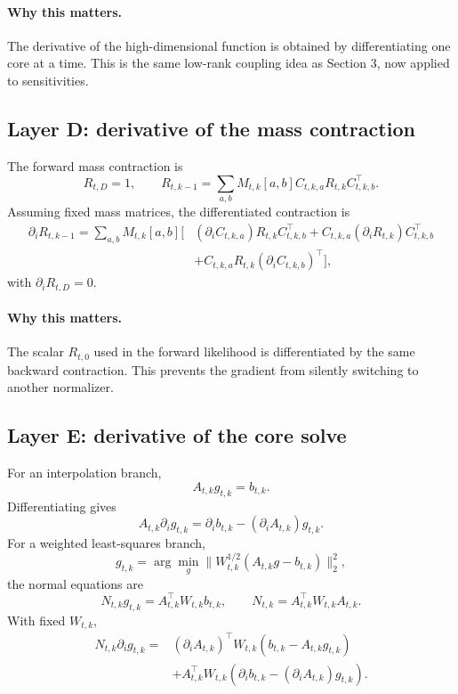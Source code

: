 \documentclass[11pt]{article}
\renewcommand{\[}{\begin{equation}}
\renewcommand{\]}{\end{equation}}
\theoremstyle{definition}
\theoremstyle{remark}
\begin{document}
\paragraph{Why this matters.}
The derivative of the high-dimensional function is obtained by differentiating
one core at a time.  This is the same low-rank coupling idea as Section 3, now
applied to sensitivities.

\subsection*{Layer D: derivative of the mass contraction}

The forward mass contraction is
\[
  R_{t,D}=1,\qquad
  R_{t,k-1}
  =
  \sum_{a,b}
  M_{t,k}[a,b]C_{t,k,a}R_{t,k}C_{t,k,b}^{\top}.
  \label{eq:p14-layerD-R}
\]
Assuming fixed mass matrices, the differentiated contraction is
\[
\begin{aligned}
  \partial_iR_{t,k-1}
  =
  \sum_{a,b}M_{t,k}[a,b]\Big[
  &(\partial_iC_{t,k,a})R_{t,k}C_{t,k,b}^{\top}
  +C_{t,k,a}(\partial_iR_{t,k})C_{t,k,b}^{\top}\\
  &+C_{t,k,a}R_{t,k}(\partial_iC_{t,k,b})^{\top}
  \Big],
\end{aligned}
  \label{eq:p14-layerD-Rdot}
\]
with \(\partial_iR_{t,D}=0\).

\paragraph{Why this matters.}
The scalar \(R_{t,0}\) used in the forward likelihood is differentiated by the
same backward contraction.  This prevents the gradient from silently switching
to another normalizer.

\subsection*{Layer E: derivative of the core solve}

For an interpolation branch,
\[
  A_{t,k}g_{t,k}=b_{t,k}.
  \label{eq:p14-layerE-interp}
\]
Differentiating gives
\[
  A_{t,k}\partial_i g_{t,k}
  =
  \partial_i b_{t,k}
  -
  (\partial_iA_{t,k})g_{t,k}.
  \label{eq:p14-layerE-interpdot}
\]
For a weighted least-squares branch,
\[
  g_{t,k}
  =
  \arg\min_g
  \|W_{t,k}^{1/2}(A_{t,k}g-b_{t,k})\|_2^2,
  \label{eq:p14-layerE-ls}
\]
the normal equations are
\[
  N_{t,k}g_{t,k}=A_{t,k}^{\top}W_{t,k}b_{t,k},
  \qquad
  N_{t,k}=A_{t,k}^{\top}W_{t,k}A_{t,k}.
  \label{eq:p14-layerE-normal}
\]
With fixed \(W_{t,k}\),
\[
\begin{aligned}
  N_{t,k}\partial_i g_{t,k}
  =
  &(\partial_i A_{t,k})^\top W_{t,k}
  (b_{t,k}-A_{t,k}g_{t,k})\\
  &+
  A_{t,k}^{\top}W_{t,k}
  (\partial_i b_{t,k}-(\partial_iA_{t,k})g_{t,k}).
\end{aligned}
  \label{eq:p14-layerE-lsdot}
\]
\end{document}
